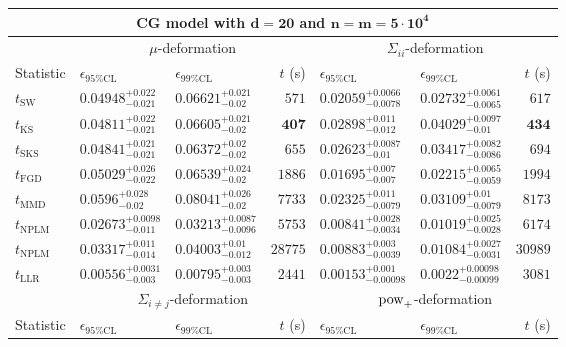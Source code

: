 \begin{tabular}{l|llr|llr}
	\toprule
	\multicolumn{7}{c}{{\bf CG model with $\mathbf{d=20}$ and $\mathbf{n=m=5\cdot 10^{4}}$}} \\
	\toprule
	\multicolumn{1}{c}{} & \multicolumn{3}{c}{$\mu$-deformation} & \multicolumn{3}{c}{$\Sigma_{ii}$-deformation} \\
	Statistic & $\epsilon_{95\%\mathrm{CL}}$ & $\epsilon_{99\%\mathrm{CL}}$ & $t$ (s) & $\epsilon_{95\%\mathrm{CL}}$ & $\epsilon_{99\%\mathrm{CL}}$ & $t$ (s) \\
	\midrule
	$t_{\mathrm{SW}}$ & $0.04948_{-0.021}^{+0.022}$ & $0.06621_{-0.02}^{+0.021}$ & $571$ & $0.02059_{-0.0078}^{+0.0066}$ & $0.02732_{-0.0065}^{+0.0061}$ & $617$ \\
	$t_{\overline{\mathrm{KS}}}$ & ${\mathbf{0.04811_{-0.021}^{+0.022}}}$ & $0.06605_{-0.02}^{+0.021}$ & ${\mathbf{407}}$ & $0.02898_{-0.012}^{+0.011}$ & $0.04029_{-0.01}^{+0.0097}$ & ${\mathbf{434}}$ \\
	$t_{\mathrm{SKS}}$ & $0.04841_{-0.021}^{+0.021}$ & ${\mathbf{0.06372_{-0.02}^{+0.02}}}$ & $655$ & $0.02623_{-0.01}^{+0.0087}$ & $0.03417_{-0.0086}^{+0.0082}$ & $694$ \\
	$t_{\mathrm{FGD}}$ & $0.05029_{-0.022}^{+0.026}$ & $0.06539_{-0.02}^{+0.024}$ & $1886$ & ${\mathbf{0.01695_{-0.007}^{+0.007}}}$ & ${\mathbf{0.02215_{-0.0059}^{+0.0065}}}$ & $1994$ \\
	$t_{\mathrm{MMD}}$ & $0.0596_{-0.02}^{+0.028}$ & $0.08041_{-0.02}^{+0.026}$ & $7733$ & $0.02325_{-0.0079}^{+0.011}$ & $0.03109_{-0.0079}^{+0.01}$ & $8173$ \\
\rowcolor{red!35}	$t_{\mathrm{NPLM}}$ & $0.02673_{-0.011}^{+0.0098}$ & $0.03213_{-0.0096}^{+0.0087}$ & $5753$ & $0.00841_{-0.0034}^{+0.0028}$ & $0.01019_{-0.0028}^{+0.0025}$ & $6174$ \\
\rowcolor{blue!35}	$t_{\mathrm{NPLM}}$ & $0.03317_{-0.014}^{+0.011}$ & $0.04003_{-0.012}^{+0.01}$ & $28775$ & $0.00883_{-0.0039}^{+0.003}$ & $0.01084_{-0.0031}^{+0.0027}$ & $30989$ \\
	$t_{\mathrm{LLR}}$ & $0.00556_{-0.003}^{+0.0031}$ & $0.00795_{-0.003}^{+0.003}$ & $2441$ & $0.00153_{-0.00098}^{+0.001}$ & $0.0022_{-0.00099}^{+0.00098}$ & $3081$ \\
	\toprule
	\multicolumn{1}{c}{} & \multicolumn{3}{c}{$\Sigma_{i\neq j}$-deformation} & \multicolumn{3}{c}{$\rm{pow}_{+}$-deformation} \\
	Statistic & $\epsilon_{95\%\mathrm{CL}}$ & $\epsilon_{99\%\mathrm{CL}}$ & $t$ (s) & $\epsilon_{95\%\mathrm{CL}}$ & $\epsilon_{99\%\mathrm{CL}}$ & $t$ (s) \\

\end{tabular}
